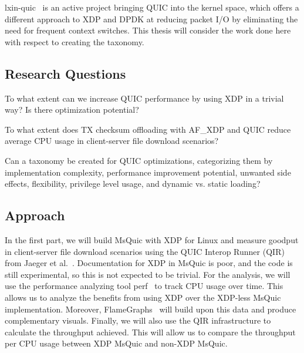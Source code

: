 \documentclass[NET,a4paper,12pt,english]{netforms}
\begin{document}
lxin-quic~\cite{quic_lxin} is an active project bringing QUIC into the kernel space, which offers a different approach to XDP and DPDK at reducing packet I/O by eliminating the need for frequent context switches. This thesis will consider the work done here with respect to creating the taxonomy.

\subsection*{Research Questions}


\begin{researchquestions}
\item To what extent can we increase QUIC performance by using XDP in a trivial way? Is there optimization potential?
\item To what extent does TX checksum offloading with AF\_XDP and QUIC reduce average CPU usage in client-server file download scenarios?
\item Can a taxonomy be created for QUIC optimizations, categorizing them by implementation complexity, performance improvement potential, unwanted side effects, flexibility, privilege level usage, and dynamic vs. static loading?
\end{researchquestions}

\subsection*{Approach}
In the first part, we will build MsQuic with XDP for Linux and measure goodput in client-server file download scenarios using the QUIC Interop Runner (QIR) from Jaeger et al.~\cite{quic_on_the_highway}. Documentation for XDP in MsQuic is poor, and the code is still experimental, so this is not expected to be trivial. For the analysis, we will use the performance analyzing tool perf~\cite{melo2010perf} to track CPU usage over time. This allows us to analyze the benefits from using XDP over the XDP-less MsQuic implementation. Moreover, FlameGraphs~\cite{gregg_flamegraph_2024} will build upon this data and produce complementary visuals. Finally, we will also use the QIR infrastructure to calculate the throughput achieved. This will allow us to compare the throughput per CPU usage between XDP MsQuic and non-XDP MsQuic.
\end{document}
